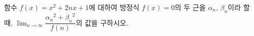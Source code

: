 함수 $f(x)=x^2+2nx+1$에 대하여 방정식 $f(x)=0$의 두 근을 $\alpha_n$, $\beta_n$이라 할 때, $\displaystyle\lim_{n\to\infty}\dfrac{{\alpha_n}^2+{\beta_n}^2}{f(n)}$의 값을 구하시오. 
